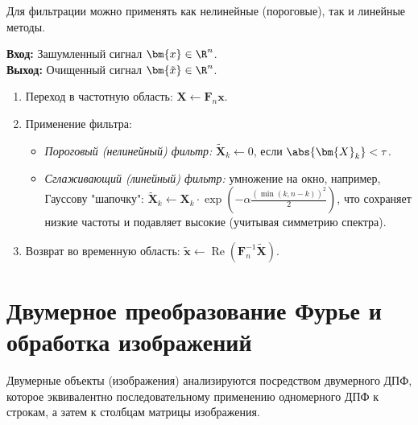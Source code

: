 Для фильтрации можно применять как нелинейные (пороговые), так и линейные методы.

\begin{tcbalgorithmbox}
\label{alg:signal_filtering}
    \textbf{Вход:} Зашумленный сигнал $\bm{x} \in \R^n$.\\
    \textbf{Выход:} Очищенный сигнал $\bm{\tilde{x}} \in \R^n$.
    \begin{enumerate}
        \item Переход в частотную область: $\bm{X} \gets \bm{F}_n \bm{x}$.
        \item Применение фильтра:
        \begin{itemize}
            \item \textit{Пороговый (нелинейный) фильтр:} $\bm{\tilde{X}}_k \gets 0$, если $\abs{\bm{X}_k} < \tau$.
            \item \textit{Сглаживающий (линейный) фильтр:} умножение на окно, например, Гауссову "шапочку": $\bm{\tilde{X}}_k \gets \bm{X}_k \cdot \exp\left(-\alpha \frac{(\min(k, n-k))^2}{2}\right)$, что сохраняет низкие частоты и подавляет высокие (учитывая симметрию спектра).
        \end{itemize}
        \item Возврат во временную область: $\bm{\tilde{x}} \gets \operatorname{Re}(\bm{F}_n^{-1} \bm{\tilde{X}})$.
    \end{enumerate}
\end{tcbalgorithmbox}

\section{Двумерное преобразование Фурье и обработка изображений}
\label{sec:2d_fourier}

Двумерные объекты (изображения) анализируются посредством двумерного ДПФ, которое эквивалентно последовательному применению одномерного ДПФ к строкам, а затем к столбцам матрицы изображения.

